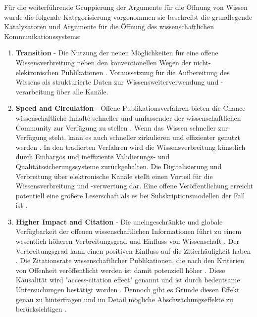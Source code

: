 Für die weiterführende Gruppierung der Argumente für die Öffnung von Wissen wurde die folgende Kategorisierung vorgenommen sie beschreibt die grundlegende Katalysatoren und Argumente für die Öffnung des wissenschaftlichen Kommunikationssystems:
\begin{enumerate}
\item \textbf{Transition} - Die Nutzung der neuen Möglichkeiten für eine offene Wissensverbreitung neben den konventionellen Wegen der nicht-elektronischen Publikationen \cite{hall_2008_digitize} \cite{berliner_erklaerung_2003}. Voraussetzung für die Aufbereitung des Wissens als strukturierte Daten zur Wissensweiterverwendung und -verarbeitung über alle Kanäle.
\item \textbf{Speed and Circulation} - Offene Publikationsverfahren bieten die Chance wissenschaftliche Inhalte schneller und umfassender der wissenschaftlichen Community zur Verfügung zu stellen \cite{muller_2010_open}\cite{RIN_2010_open_research} \cite{hall_2008_digitize} \cite{EuropeanCommission_sciencepub_2006}. Wenn das Wissen schneller zur Verfügung steht, kann es auch schneller zirkulieren und effizienter genutzt werden \cite{Woelfle_2011}. In den tradierten Verfahren wird die Wissensverbreitung künstlich durch Embargos und ineffiziente Validierungs- und Qualitätssicherungssysteme zurückgehalten. Die Digitalisierung und Verbreitung über elektronische Kanäle stellt einen Vorteil für die Wissensverbreitung und -verwertung dar. Eine offene Veröffentlichung erreicht potentiell eine größere Leserschaft als es bei Subskriptionsmodellen der Fall ist \cite{cope2014future}.
\item \textbf{Higher Impact and Citation} - Die uneingeschränkte und globale Verfügbarkeit der offenen wissenschaftlichen Informationen führt zu einem wesentlich höheren Verbreitungsgrad und Einfluss von Wissenschaft \cite{davis_2011_open} \cite{muller_2010_open} \cite{Baggs_2006} \cite{cite:5} \cite{Kurtz2005_oa_citation}. Der Verbreitungsgrad kann einen positiven Einfluss auf die Zitierhäufigkeit haben \cite{muller_2010_open} \cite{EuropeanCommission_sciencepub_2006} \cite{Hajjem_2005}. Die Zitationsrate wissenschaftlicher Publikationen, die nach den Kriterien von Offenheit veröffentlicht werden ist damit potenziell höher \cite{cite:21a}. Diese Kausalität wird "access-citation effect"\cite{davis_2011_open} genannt und ist durch bedeutsame Untersuchungen bestätigt worden \cite{Lawrence_2001} \cite{Jeffrey_2008} \cite{Hajjem_2005} \cite{Eysenbach_2006} \cite{Antelman_2004}. Dennoch gibt es Gründe diesen Effekt genau zu hinterfragen und im Detail mögliche Abschwächungseffekte zu berücksichtigen \cite{davis_2011_open} \cite{davis_2008_open}.

\end{enumerate}
